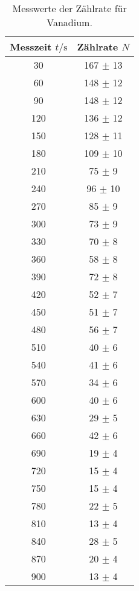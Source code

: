 \begin{table}[H]
  \centering
  \begin{tabular}{c c}
    \toprule
    Messzeit $t/\unit{\second}$ & Zählrate $N$\\
    \midrule
    30  &  167  $ \pm $  13  \\
    60  &  148  $ \pm $  12  \\
    90  &  148  $ \pm $  12  \\
    120  &  136  $ \pm $  12  \\
    150  &  128  $ \pm $  11  \\
    180  &  109  $ \pm $  10  \\
    210  &  75  $ \pm $  9  \\
    240  &  96  $ \pm $  10  \\
    270  &  85  $ \pm $  9  \\
    300  &  73  $ \pm $  9  \\
    330  &  70  $ \pm $  8  \\
    360  &  58  $ \pm $  8  \\
    390  &  72  $ \pm $  8  \\
    420  &  52  $ \pm $  7  \\
    450  &  51  $ \pm $  7  \\
    480  &  56  $ \pm $  7  \\
    510  &  40  $ \pm $  6  \\
    540  &  41  $ \pm $  6  \\
    570  &  34  $ \pm $  6  \\
    600  &  40  $ \pm $  6  \\
    630  &  29  $ \pm $  5  \\
    660  &  42  $ \pm $  6  \\
    690  &  19  $ \pm $  4  \\
    720  &  15  $ \pm $  4  \\
    750  &  15  $ \pm $  4  \\
    780  &  22  $ \pm $  5  \\
    810  &  13  $ \pm $  4  \\
    840  &  28  $ \pm $  5  \\
    870  &  20  $ \pm $  4  \\
    900  &  13  $ \pm $  4  \\
    \bottomrule
  \end{tabular}
  \caption{Messwerte der Zählrate für Vanadium.}
  \label{tab:vanadium}
\end{table}


